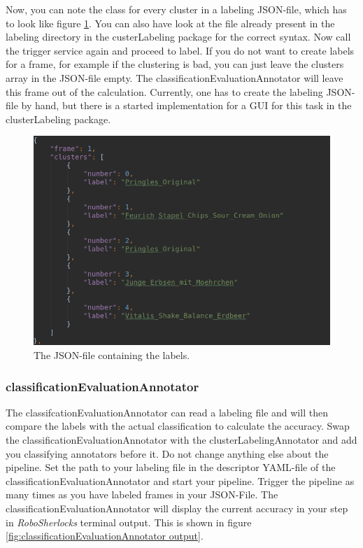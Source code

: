 \documentclass[main.tex]{subfiles}
\begin{document}
\newpage


Now, you can note the class for every cluster in a labeling JSON-file, which has to look like figure \ref{fig:labeling file}. You can also have look at the file already present in the labeling directory in the custerLabeling package for the correct syntax. Now call the trigger service again and proceed to label. If you do not want to create labels for a frame, for example if the clustering is bad, you can just leave the clusters array in the JSON-file empty. The classificationEvaluationAnnotator will leave this frame out of the calculation. Currently, one has to create the labeling JSON-file by hand, but there is a started implementation for a GUI for this task in the clusterLabeling package.

\begin{figure}
  \includegraphics[width=\linewidth]{pictures/perception/labeling_file.png}
  \caption{The JSON-file containing the labels.}
  \label{fig:labeling file}
\end{figure}


\subsubsection{classificationEvaluationAnnotator}
The classifcationEvaluationAnnotator can read a labeling file and will then compare the labels with the actual classification to calculate the accuracy. Swap the classificationEvaluationAnnotator with the clusterLabelingAnnotator and add you classifying annotators before it. Do not change anything else about the pipeline. Set the path to your labeling file in the descriptor YAML-file of the classificationEvaluationAnnotator and start your pipeline. Trigger the pipeline as many times as you have labeled frames in your JSON-File. The classificationEvaluationAnnotator will display the current accuracy in your step in \textit{RoboSherlocks} terminal output. This is shown in figure \ref{fig:classificationEvaluationAnnotator output}.
\end{document}
